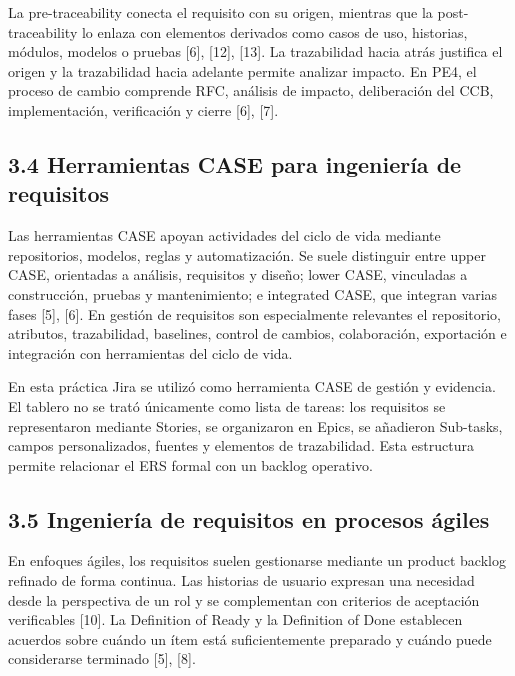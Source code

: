 \documentclass[12pt]{article}
\begin{document}
La pre-traceability conecta el requisito con su origen, mientras que la post-traceability lo enlaza con elementos derivados como casos de uso, historias, módulos, modelos o pruebas {[}6{]}, {[}12{]}, {[}13{]}. La trazabilidad hacia atrás justifica el origen y la trazabilidad hacia adelante permite analizar impacto. En PE4, el proceso de cambio comprende RFC, análisis de impacto, deliberación del CCB, implementación, verificación y cierre {[}6{]}, {[}7{]}.

\subsection{\texorpdfstring{3.4 Herramientas CASE para ingeniería de requisitos}{3.4 Herramientas CASE para ingeniería de requisitos}}\label{herramientas-case-para-ingenieruxeda-de-requisitos}

Las herramientas CASE apoyan actividades del ciclo de vida mediante repositorios, modelos, reglas y automatización. Se suele distinguir entre upper CASE, orientadas a análisis, requisitos y diseño; lower CASE, vinculadas a construcción, pruebas y mantenimiento; e integrated CASE, que integran varias fases {[}5{]}, {[}6{]}. En gestión de requisitos son especialmente relevantes el repositorio, atributos, trazabilidad, baselines, control de cambios, colaboración, exportación e integración con herramientas del ciclo de vida.

En esta práctica Jira se utilizó como herramienta CASE de gestión y evidencia. El tablero no se trató únicamente como lista de tareas: los requisitos se representaron mediante Stories, se organizaron en Epics, se añadieron Sub-tasks, campos personalizados, fuentes y elementos de trazabilidad. Esta estructura permite relacionar el ERS formal con un backlog operativo.

\subsection{\texorpdfstring{3.5 Ingeniería de requisitos en procesos ágiles}{3.5 Ingeniería de requisitos en procesos ágiles}}\label{ingenieruxeda-de-requisitos-en-procesos-uxe1giles}

En enfoques ágiles, los requisitos suelen gestionarse mediante un product backlog refinado de forma continua. Las historias de usuario expresan una necesidad desde la perspectiva de un rol y se complementan con criterios de aceptación verificables {[}10{]}. La Definition of Ready y la Definition of Done establecen acuerdos sobre cuándo un ítem está suficientemente preparado y cuándo puede considerarse terminado {[}5{]}, {[}8{]}.
\end{document}
